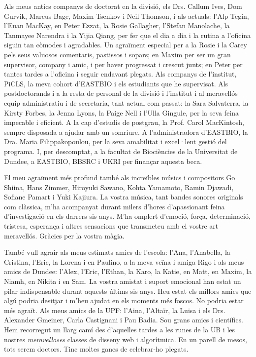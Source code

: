 Als meus antics companys de doctorat en la divisió, els Drs. Callum Ives, Dom Gurvik, Marcus Bage, Maxim Tsenkov i Neil Thomson, i als actuals: l'Alp Tegin, l'Euan MacKay, en Peter Ezzat, la Rosie Gallagher, l'Stefan Manolache, la Tanmayee Narendra i la Yijia Qiang, per fer que el dia a dia i la rutina a l'oficina siguin tan còmodes i agradables. Un agraïment especial per a la Rosie i la Carey pels seus valuosos comentaris, pastissos i sopars; en Maxim per ser un gran supervisor, company i amic, i per haver progressat i crescut junts; en Peter per tantes tardes a l'oficina i seguir endavant plegats. Als companys de l'institut, PiCLS, la meva cohort d'EASTBIO i els estudiants que he supervisat. Als postdoctorands i a la resta de personal de la divisió i l'institut i al meravellós equip administratiu i de secretaria, tant actual com passat: la Sara Salvaterra, la Kirsty Forbes, la Jenna Lyons, la Paige Nell i l'Ulla Gingule, per la seva feina impecable i eficient. A la cap d'estudis de postgrau, la Prof. Carol MacKintosh, sempre disposada a ajudar amb un somriure. A l'administradora d'EASTBIO, la Dra. Maria Filippakopoulou, per la seva amabilitat i excel·lent gestió del programa. I, per descomptat, a la facultat de Biociències de la Universitat de Dundee, a EASTBIO, BBSRC i UKRI per finançar aquesta beca.

El meu agraïment més profund també als increïbles músics i compositors Go Shiina, Hans Zimmer, Hiroyuki Sawano, Kohta Yamamoto, Ramin Djawadi, Sofiane Pamart i Yuki Kajiura. La vostra música, tant bandes sonores originals com clàssica, m'ha acompanyat durant milers d'hores d'apassionant feina d'investigació en els darrers sis anys. M'ha omplert d'emoció, força, determinació, tristesa, esperança i altres sensacions que transmeteu amb el vostre art meravellós. Gràcies per la vostra màgia.

També vull agrair als meus estimats amics de l'escola: l'Ana, l'Anabella, la Cristina, l'Eric, la Lorena i en Paulino, a la meva veïna i amiga Rigo i als meus amics de Dundee: l'Alex, l'Eric, l'Ethan, la Karo, la Katie, en Matt, en Maxim, la Niamh, en Nikita i en Sam. La vostra amistat i suport emocional han estat un pilar indispensable durant aquests últims sis anys. Heu estat els millors amics que algú podria desitjar i m'heu ajudat en els moments més foscos. No podria estar més agraït. Als meus amics de la UPF: l'Aina, l'Altaïr, la Luisa i els Drs. Alexander Gmeiner, Carla Castignani i Pau Badia. Sou grans amics i científics. Hem recorregut un llarg camí des d'aquelles tardes a les runes de la UB i les nostres \textit{meravelloses} classes de disseny web i algorítmica. En un parell de mesos, tots serem doctors. Tinc moltes ganes de celebrar-ho plegats.

